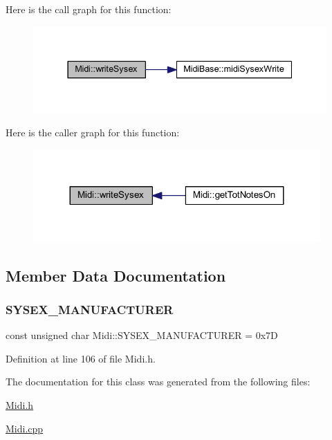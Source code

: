 Here is the call graph for this function\+:
\nopagebreak
\begin{figure}[H]
\begin{center}
\leavevmode
\includegraphics[width=337pt]{class_midi_a57efc17c9561b9ca9763d610b4feea9e_cgraph}
\end{center}
\end{figure}
Here is the caller graph for this function\+:
\nopagebreak
\begin{figure}[H]
\begin{center}
\leavevmode
\includegraphics[width=311pt]{class_midi_a57efc17c9561b9ca9763d610b4feea9e_icgraph}
\end{center}
\end{figure}


\subsection{Member Data Documentation}
\mbox{\label{class_midi_aa4332beed702e57a3aeb00c0c831b9b0}} 
\subsubsection{\texorpdfstring{S\+Y\+S\+E\+X\+\_\+\+M\+A\+N\+U\+F\+A\+C\+T\+U\+R\+ER}{SYSEX\_MANUFACTURER}}
{\footnotesize\ttfamily const unsigned char Midi\+::\+S\+Y\+S\+E\+X\+\_\+\+M\+A\+N\+U\+F\+A\+C\+T\+U\+R\+ER = 0x7D}



Definition at line 106 of file Midi.\+h.



The documentation for this class was generated from the following files\+:\begin{DoxyCompactItemize}
\item 
\hyperlink{_midi_8h}{Midi.\+h}\item 
\hyperlink{_midi_8cpp}{Midi.\+cpp}\end{DoxyCompactItemize}
